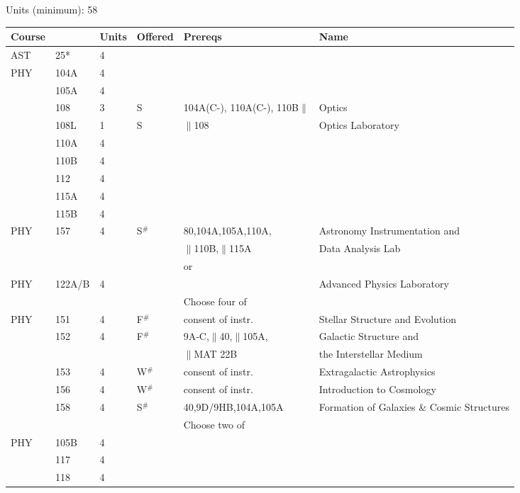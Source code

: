 \documentclass[12pt]{article}
\begin{document}
\newpage
{}
\noindent
\vskip 0.25cm
\noindent
Units (minimum):  58 \\
\begin{tabular}{|llllll|}
\hline
Course & & Units & Offered & Prereqs & Name \\
\hline
AST & 25* & 4 & & & \\ 
PHY & 104A & 4 & & & \\ 
    & 105A & 4 & & & \\
    & 108  & 3 & S & 104A(C-), 110A(C-), 110B$\parallel$ & Optics \\
    & 108L & 1 & S & $\parallel$108 & Optics Laboratory \\  
    & 110A & 4 & & & \\
    & 110B & 4 & & & \\
    & 112  & 4 & & & \\    
    & 115A & 4 & & & \\
    & 115B & 4 & & & \\
\hline
\hline
PHY & 157 & 4 & S$^\#$ & 80,104A,105A,110A, & Astronomy Instrumentation and \\  
    &     &   &     & $\parallel$110B,$\parallel$115A & Data Analysis Lab\\  
\hline
    & & & & or & \\
\hline
PHY & 122A/B & 4 & & & Advanced Physics Laboratory \\  
\hline
\hline
 & & & & Choose four of & \\
\hline
PHY & 151 & 4 & F$^\#$ & consent of instr. & Stellar Structure and Evolution \\ 
    & 152 & 4 & F$^\#$ & 9A-C,$\parallel$40,$\parallel$105A, & Galactic Structure and \\
    &     &   &     & $\parallel$MAT 22B & the Interstellar Medium\\
    & 153 & 4 & W$^\#$ & consent of instr. & Extragalactic Astrophysics\\  
    & 156 & 4 & W$^\#$ & consent of instr. & Introduction to Cosmology\\ 
    & 158  & 4 & S$^\#$ & 40,9D/9HB,104A,105A & Formation of Galaxies \& Cosmic Structures \\ 
\hline
\hline
 & & & & Choose two of & \\
\hline 
PHY & 105B & 4 &  &  & \\ 
    & 117  & 4 &  &  & \\  
    & 118  & 4 &  &  & \\  

\end{tabular}
\end{document}
